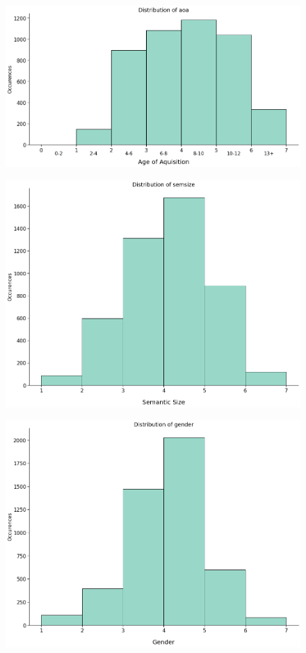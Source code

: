 \documentclass[a4paper,11pt,dvipsnames]{article}
\begin{document}
\begin{figure}[ht]
\begin{minipage}[b]{.3\linewidth}
\end{minipage}

\begin{minipage}[b]{.3\linewidth}
\centering\large \includegraphics[width=0.9\linewidth]{Graphs/aoa_distribution.png}
\label{fig:aoadis}
\end{minipage}%
\begin{minipage}[b]{.3\linewidth}
\centering\includegraphics[width=0.9\linewidth]{Graphs/semsize_distribution.png}\label{fig:semdis}
\end{minipage}
\begin{minipage}[b]{.3\linewidth}
\centering\includegraphics[width=0.9\linewidth]{Graphs/gender_distribution.png}\label{fig:gendis}
\end{minipage}



\end{figure}
\end{document}
